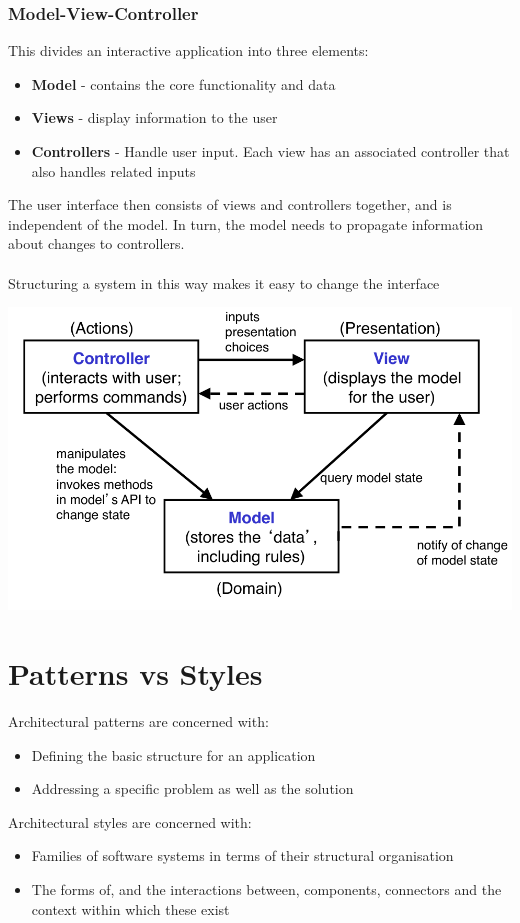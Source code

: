 \documentclass{article}[18pt]
\begin{document}
\subsubsection{Model-View-Controller}
This divides an interactive application into three elements:
\begin{itemize}
	\item \textbf{Model} - contains the core functionality and data
	\item \textbf{Views} - display information to the user
	\item \textbf{Controllers} - Handle user input. Each view has an associated controller that also handles related inputs
\end{itemize}
The user interface then consists of views and controllers together, and is independent of the model. In turn, the model needs to propagate information about changes to controllers.\\
\\
Structuring a system in this way makes it easy to change the interface
\begin{center}
	\includegraphics[scale=0.7]{MVC}
\end{center}
\section{Patterns vs Styles}
Architectural patterns are concerned with:
\begin{itemize}
	\item Defining the basic structure for an application
	\item Addressing a specific problem as well as the solution
\end{itemize}
Architectural styles are concerned with:
\begin{itemize}
	\item Families of software systems in terms of their structural organisation
	\item The forms of, and the interactions between, components, connectors and the context within which these exist
\end{itemize}
\end{document}
